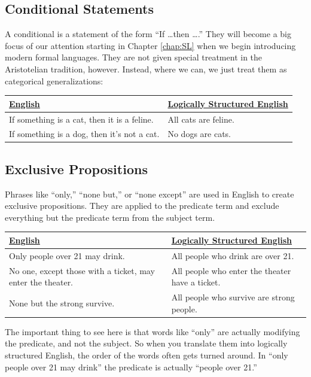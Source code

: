 \subsection{Conditional Statements}

A conditional is a statement of the form ``If \ldots then \ldots.'' They will become a big focus of our attention starting in Chapter \ref{chap:SL} when we begin introducing modern formal languages. They are not given special treatment in the Aristotelian tradition, however. Instead, where we can, we just treat them as categorical generalizations:

\begin{longtabu}{p{.5\linewidth}p{.5\linewidth}}
\underline{English} &
\underline{Logically Structured English} \\
\endhead 
If something is a cat, then it is a feline. &
All cats are feline.\\

If something is a dog, then it's not a cat. &
No dogs are cats. \\
\end{longtabu}


\subsection{Exclusive Propositions}

Phrases like ``only,'' ``none but,'' or ``none except'' are used in English to create exclusive propositions. They are applied to the predicate term and exclude everything but the predicate term from the subject term. 

\begin{longtabu}{p{.5\linewidth}p{.5\linewidth}}
\underline{English} &
\underline{Logically Structured English} \\
\endhead 
Only people over 21 may drink. &
All people who drink are over 21.\\

No one, except those with a ticket, may enter the theater. &
All people who enter the theater have a ticket. \\

None but the strong survive. &
All people who survive are strong people. \\
\end{longtabu}

The important thing to see here is that words like ``only'' are actually modifying the predicate, and not the subject. So when you translate them into logically structured English, the order of the words often gets turned around. In ``only people over 21 may drink'' the predicate is actually ``people over 21.''


